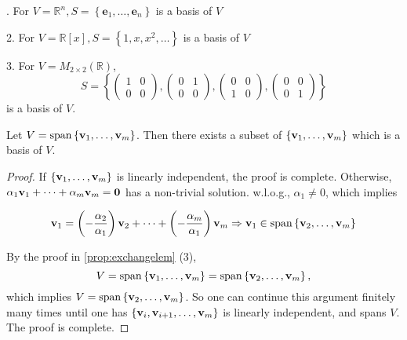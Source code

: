 \begin{example} 
. For \(V = {\mathbb{R}}^n,S = \left\{  {{\mathbf{e}}_1,\ldots ,{\mathbf{e}}_n}\right\}\) is a basis of \(V\)

2. For \(V = \mathbb{R}\left\lbrack  x\right\rbrack  ,S = \left\{  {1,x,{x}^2,\ldots }\right\}\) is a basis of \(V\)

3. For \(V = {M}_{2 \times  2}\left( \mathbb{R}\right)\),
\[
S = \left\{  {\left( \begin{array}{ll} 1 & 0 \\  0 & 0 \end{array}\right) ,\left( \begin{array}{ll} 0 & 1 \\  0 & 0 \end{array}\right) ,\left( \begin{array}{ll} 0 & 0 \\  1 & 0 \end{array}\right) ,\left( \begin{array}{ll} 0 & 0 \\  0 & 1 \end{array}\right) }\right\}
\]
is a basis of \(V\).
\end{example}

\begin{proposition} Let \(V = \operatorname{span}\left\{  {{\bf v}_1,\ldots ,{\bf v}_{m}}\right\}\). Then there exists a subset of \(\left\{  {{\bf v}_1,\ldots ,{\bf v}_{m}}\right\}\) which is a basis of \(V\).
\end{proposition}

\begin{proof} If \(\left\{  {{\bf v}_1,\ldots ,{\bf v}_{m}}\right\}\) is linearly independent, the proof is complete. Otherwise, \(\alpha_1{\bf v}_1 + \cdots  + \alpha_{m}{\bf v}_{m} = \mathbf{0}\) has a non-trivial solution. w.l.o.g., \(\alpha_1 \neq  0\), which implies

\[
{\bf v}_1 =  \left(- \frac{\alpha_2}{\alpha_1}\right){\bf v}_2 + \cdots  + \left(- \frac{\alpha_{m}}{\alpha_1}\right) {\bf v}_{m} \Rightarrow  {\bf v}_1 \in  \operatorname{span}\left\{  {{\bf v}_2,\ldots ,{\bf v}_{m}}\right\}
\]

By the proof in \autoref{prop:exchangelem} (3),
\[
V =\operatorname{span}\left\{  {{\bf v}_1,\ldots ,{\bf v}_{m}}\right\}   = \operatorname{span}\left\{  {{\bf v}_2,\ldots ,{\bf v}_{m}}\right\}  ,
\]
which implies \(V = \operatorname{span}\left\{  {{\bf v}_2,\ldots ,{\bf v}_{m}}\right\}\).
So one can continue this argument finitely many times until one has \(\left\{  {{\bf v}_{i},{\bf v}_{i + 1},\ldots ,{\bf v}_{m}}\right\}\) is linearly independent, and spans \(V\). The proof is complete.
\end{proof}


